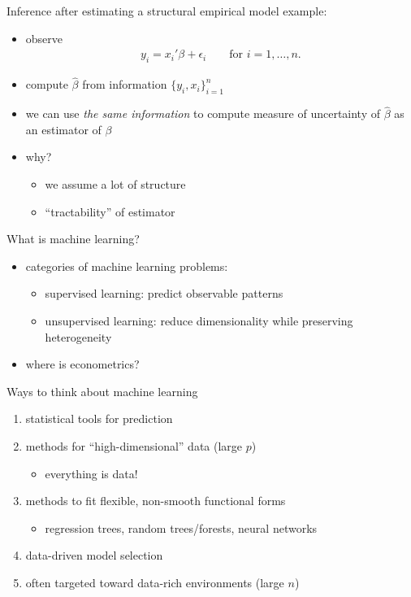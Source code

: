 \documentclass[xcolor=dvipsnames]{beamer}
\begin{document}
\begin{frame}{Inference after estimating a structural empirical model}
example: 
\begin{itemize}
  \item 
  observe
  \begin{align*}
    y_i = x_i'\beta + \epsilon_i \qquad \text{for $i = 1, \dotsc, n$}.
  \end{align*}
  \item 
  compute $\hat{\beta}$ from information $\{y_i, x_i\}_{i=1}^n$ 
  \item 
  \pause
  we can use \emph{the same information} to compute measure of uncertainty of $\hat{\beta}$ as an estimator of $\beta$
  \item why? 
  \pause 
  \begin{itemize}
    \item we assume a lot of structure 
    \item ``tractability'' of estimator
  \end{itemize}
\end{itemize}
\end{frame}


\begin{frame}{What is machine learning?}
\pause
\begin{itemize}
  \item categories of machine learning problems:
  \begin{itemize}
  \item supervised learning: predict observable patterns
  \item unsupervised learning: reduce dimensionality while preserving heterogeneity
  \end{itemize}
  \pause
  \item where is econometrics?
\end{itemize}
\end{frame}


\begin{frame}{Ways to think about machine learning}
\begin{enumerate}
  \item
  statistical tools for prediction
  \pause\item 
  methods for ``high-dimensional'' data (large $p$)
  \begin{itemize}
    \pause\item everything is data!
  \end{itemize}
  \pause\item 
  methods to fit flexible, non-smooth functional forms 
  \begin{itemize}
    \item regression trees, random trees/forests, neural networks
  \end{itemize}
  \pause\item 
  data-driven model selection
  \pause\item 
  often targeted toward data-rich environments (large $n$)
\end{enumerate}
\end{frame}
\end{document}
